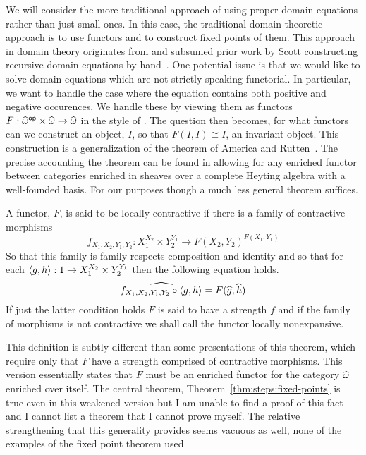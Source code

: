 We will consider the more traditional approach of using proper domain
equations rather than just small ones. In this case, the traditional
domain theoretic approach is to use functors and to construct fixed
points of them. This approach in domain theory originates from
\citet{TODO-PLOTKIN-SMYTH} and subsumed prior work by Scott
constructing recursive domain equations by
hand~\citep{TODO-SCOTT}. One potential issue is that we would like to
solve domain equations which are not strictly speaking functorial. In
particular, we want to handle the case where the equation contains
both positive and negative occurences. We handle these by viewing them
as functors
$F : \widehat{\omega}^{\mathsf{op}} \times \widehat{\omega} \to
\widehat{\omega}$
in the style of \citet{TODO-MIXED-VARIANCE}. The question then
becomes, for what functors can we construct an object, $I$, so that
$F(I, I) \cong I$, an invariant object. This construction is a
generalization of the theorem of America and
Rutten~\citep{TODO-AMERICA}. The precise accounting the theorem can
be found in \citet{Birkedal:11} allowing for any enriched functor
between categories enriched in sheaves over a complete Heyting algebra
with a well-founded basis. For our purposes though a much less general
theorem suffices.
\begin{defn}
  A functor, $F$, is said to be locally contractive if there is a
  family of contractive morphisms
  \[
    f_{X_1, X_2, Y_1, Y_2} :
    X_1^{X_2} \times Y_2^{Y_1} \to F(X_2, Y_2)^{F(X_1, Y_1)}
  \]
  So that this family is family respects composition and identity and
  so that for each $\left\langle g, h \right\rangle : 1 \to X_1^{X_2} \times Y_2^{Y_1}$
  then the following equation holds.
  \[
    \widehat{f_{X_1, X_2, Y_1, Y_2} \circ \left\langle g, h \right\rangle} =
    F(\widehat{g}, \widehat{h})
  \]
  If just the latter condition holds $F$ is said to have a strength
  $f$ and if the family of morphisms is not contractive we shall call
  the functor locally nonexpansive.
\end{defn}
This definition is subtly different than some presentations of this
theorem, which require only that $F$ have a strength comprised of
contractive morphisms. This version essentially states that $F$ must
be an enriched functor for the category $\widehat{\omega}$ enriched
over itself. The central theorem, Theorem~\ref{thm:steps:fixed-points}
is true even in this weakened version but I am unable to find a proof
of this fact and I cannot list a theorem that I cannot prove
myself. The relative strengthening that this generality provides seems
vacuous as well, none of the examples of the fixed point theorem used
